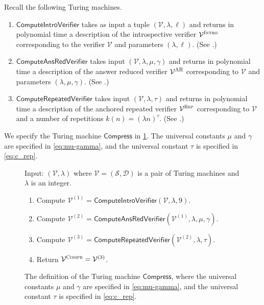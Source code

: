 \documentclass[11pt]{article}
\theoremstyle{definition}
\newcommand{\sampler}{\mathcal{S}}
\newcommand{\decider}{\mathcal{D}}
\newcommand{\verifier}{\mathcal{V}}
\newcommand{\gamestyle}[1]{\ensuremath{\textsc{#1}}\xspace}
\newcommand{\ar}{\gamestyle{AR}}
\newcommand{\intro}{\gamestyle{Intro}}
\newcommand{\compr}{\textsc{Compr}}
\newcommand{\tmstyle}[1]{\ensuremath{\mathsf{#1}}}
\newcommand{\Compress}{\tmstyle{Compress}}
\newcommand{\ComputeIntroVerifier}{\tmstyle{ComputeIntroVerifier}}
\newcommand{\ComputeAnsVerifier}{\tmstyle{ComputeAnsRedVerifier}}
\newcommand{\ComputeParrepVerifier}{\tmstyle{ComputeRepeatedVerifier}}
\newenvironment{gamespec}{
  \begin{mdframed}[style=figstyle]}{
  \end{mdframed}}
\newcommand{\rep}{\gamestyle{Rep}}
\begin{document}
Recall the following Turing machines. 
\begin{enumerate}
\item $\ComputeIntroVerifier$ takes as input a tuple $(\verifier, \lambda,
  \ell)$ and returns in polynomial time a description of the
  introspective verifier $\verifier^\intro$ corresponding to the verifier
  $\verifier$ and parameters $(\lambda, \ell)$. (See .)

\item $\ComputeAnsVerifier$ takes input $(\verifier, \lambda, \mu, \gamma)$ and returns
  in polynomial time a description of the answer reduced verifier
  $\verifier^\ar$ corresponding to $\verifier$ and parameters $(\lambda, \mu, \gamma)$. (See .)

\item $\ComputeParrepVerifier$ takes input $(\verifier, \lambda, \tau)$ and returns in
  polynomial time a description of the anchored repeated verifier $\verifier^\rep$
  corresponding to $\verifier$ and a number of repetitions $k(n) = (\lambda n)^\tau$. (See .)
\end{enumerate}

We specify the Turing machine $\Compress$ in \cref{fig:compress}. The universal constants $\mu$ and $\gamma$ are specified in \cref{eq:mu-gamma}, and the universal constant $\tau$ is specified in \cref{eq:c_rep}.

\begin{figure}[H]
  \centering
  \begin{gamespec}
  	Input: $(\verifier, \lambda)$ where $\verifier = (\sampler,\decider)$ is a pair of Turing machines and $\lambda$ is an integer.
    \begin{enumerate}


		\item \label{enu:compress-intro} Compute $\verifier^{(1)} =
      \ComputeIntroVerifier(\verifier, \lambda, 9)$.

		\item \label{enu:compress-ans} Compute $\verifier^{(2)} =
      \ComputeAnsVerifier(\verifier^{(1)}, \lambda, \mu, \gamma)$.



		\item \label{enu:compress-rep} Compute $\verifier^{(3)} =
      \ComputeParrepVerifier(\verifier^{(2)}, \lambda, \tau)$.

		\item Return $\verifier^\compr = \verifier^{(3)}$.
	\end{enumerate}
  \end{gamespec}
  \caption{The definition of the Turing machine $\Compress$, where the universal constants $\mu$ and $\gamma$ are specified in \cref{eq:mu-gamma}, and the universal constant $\tau$ is specified in \cref{eq:c_rep}.}
  \label{fig:compress}
\end{figure}
\end{document}
